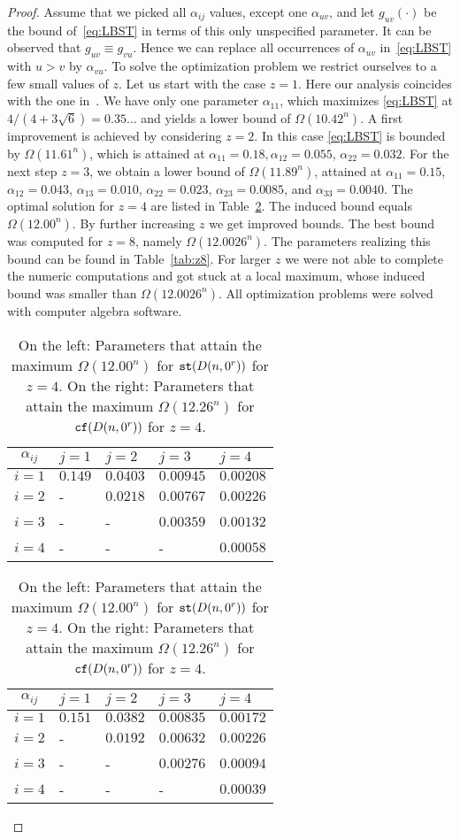 \documentclass[11pt]{article}
\def\st{{\tt st}}
\def\cf{{\tt cf}}
\begin{document}
\begin{proof}
Assume that we picked all $\alpha_{ij}$ values, except one
$\alpha_{uv}$, and let $g_{uv}(\cdot)$ be the bound of~\eqref{eq:LBST}
in terms of this only unspecified parameter. It can be observed that
$g_{uv}\equiv g_{vu}$. Hence we can replace all occurrences of
$\alpha_{uv}$ in~\eqref{eq:LBST} with $u>v$ by $\alpha_{vu}$.
To solve the optimization problem we restrict ourselves to a few small
values of $z$. Let us start with the
case $z=1$. Here our analysis coincides with the one in~\cite{D02}. We
have only one parameter $\alpha_{11}$, which maximizes \eqref{eq:LBST} at
$4/(4+3 \sqrt{6})=0.35\ldots$ and yields a lower bound of $\Omega(10.42^n)$. A
first improvement is achieved by considering $z=2$. In this case
\eqref{eq:LBST} is bounded by
$\Omega(11.61^n)$, which is attained at $\alpha_{11}= 0{.}18,
 \alpha_{12}=0{.}055$, $\alpha_{22}=0{.}032$. For the next
step $z=3$, we obtain a lower bound of $\Omega(11.89^n)$, attained at
$\alpha_{11}=0{.}15$, $\alpha_{12}=0{.}043$,
$\alpha_{13}= 0{.}010$, $\alpha_{22}=
0{.}023$, $\alpha_{23}=0{.}0085$, and $\alpha_{33}=
0{.}0040$. The optimal solution for  $z=4$ are listed in
Table~\ref{tab:z4}. The induced bound equals  $\Omega(12.00^n)$.
By further increasing $z$ we get improved bounds. The best bound was
computed for $z=8$, namely $\Omega(12.0026^n)$. The parameters
realizing this bound can be found in Table~\ref{tab:z8}. For larger
$z$ we were not able to complete the numeric computations and got
stuck at a local maximum, whose induced bound was smaller than
$\Omega(12.0026^n)$.
All optimization problems were solved with
computer algebra software.
\begin{table}[htdp]
\begin{minipage}[b]{0.5\linewidth}\centering
\centering
\begin{tabular}{c|| l l l l}
$\alpha_{ij}$ & $j=1$& $j=2$ & $j=3$ & $j=4$ \\
\hline \hline
$i\!=\!1$ & $0.149$ & $0.0403$ & $0.00945$ & $0.00208$ \\
$i\!=\!2$ & - & $0.0218$ & $0.00767$ & $0.00226$ \\
$i\!=\!3$ & - & - & $0.00359$ & $0.00132$ \\
$i\!=\!4$ & - & - & - & $ 0.00058$
\end{tabular}
\end{minipage}
\begin{minipage}[b]{0.5\linewidth}
\centering
\begin{tabular}{c|| l l l l}
$\alpha_{ij}$ & $j=1$& $j=2$ & $j=3$ & $j=4$ \\
\hline \hline
$i\!=\!1$ & $0.151$ & $0.0382$ & $0.00835$ & $0.00172$ \\
$i\!=\!2$ & - & $0.0192$ & $0.00632$ & $0.00226$ \\
$i\!=\!3$ & - & - & $0.00276$ & $0.00094$ \\
$i\!=\!4$ & - & - & - & $0.00039$
\end{tabular}
\end{minipage}
\caption{On the left: Parameters that attain the maximum
  $\Omega(12.00^n)$ for
$\st(D(n,0^r))$ for $z=4$. On the right: Parameters that attain the
  maximum $\Omega(12.26^n)$ for
$\cf(D(n,0^r))$ for $z=4$.}
\label{tab:z4}
\end{table}



\end{proof}
\end{document}
